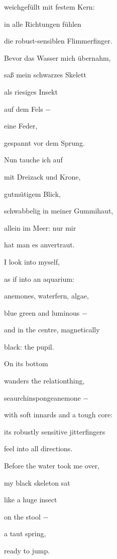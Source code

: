 weichgefüllt mit festem Kern:

in alle Richtungen fühlen

die robust-sensiblen Flimmerfinger.


\bigskip

Bevor das Wasser mich übernahm,

saß mein schwarzes Skelett

als riesiges Insekt

auf dem Fels $-$ 

eine Feder,

gespannt vor dem Sprung.


\bigskip

Nun tauche ich auf

mit Dreizack und Krone,

gutmütigem Blick,

schwabbelig in meiner Gummihaut,

allein im Meer: nur mir

hat man es anvertraut.


\bigskip


\bigskip



\bigskip

I look into myself,

as if into an aquarium:

anemones, waterfern, algae,

blue green and luminous $-$

and in the centre, magnetically

black: the pupil.


\bigskip

On its bottom 

wanders the relationthing,

seaurchinspongeanemone $-$

with soft innards and a tough core:

its robustly sensitive jitterfingers

feel into all directions.


\bigskip

Before the water took me over,

my black skeleton sat

like a huge insect

on the stool $-$

a taut spring,

ready to jump.


\bigskip

